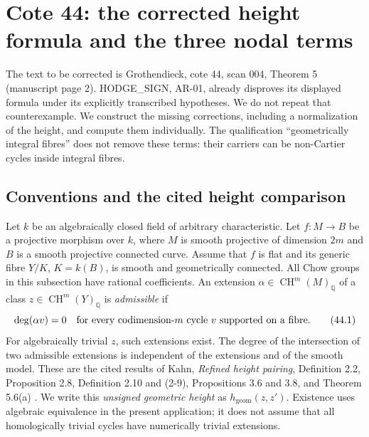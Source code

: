 
\section{Cote 44: the corrected height formula and the three nodal terms}
\label{sec:singular-fibres}

The text to be corrected is Grothendieck, cote 44, scan 004, Theorem 5
(manuscript page 2).  HODGE\_SIGN, AR-01, already disproves its displayed
formula under its explicitly transcribed hypotheses.  We do not repeat
that counterexample.  We construct the missing corrections, including a
normalization of the height, and compute them individually.  The
qualification ``geometrically integral fibres'' does not remove these
terms: their carriers can be non-Cartier cycles inside integral fibres.

\subsection{Conventions and the cited height comparison}

Let $k$ be an algebraically closed field of arbitrary characteristic.
Let $f:M\to B$ be a projective morphism over $k$,
where $M$ is smooth projective of dimension $2m$ and $B$ is a smooth
projective connected curve.  Assume that $f$ is flat and its generic
fibre $Y/K$, $K=k(B)$, is smooth and geometrically connected.  All Chow
groups in this subsection have rational coefficients.  An extension
$\alpha\in\operatorname{CH}^{m}(M)_{\mathbb Q}$ of a class
$z\in\operatorname{CH}^{m}(Y)_{\mathbb Q}$ is \emph{admissible} if
\[
 \deg(\alpha v)=0
 \quad\hbox{for every codimension-$m$ cycle $v$ supported on a fibre.}
 \tag{44.1}\label{eq:44-admissible}
\]
For algebraically trivial $z$, such extensions exist.  The degree of the
intersection of two admissible extensions is independent of the
extensions and of the smooth model.  These are the cited results of
Kahn, \emph{Refined height pairing}, Definition 2.2, Proposition 2.8,
Definition 2.10 and (2-9), Propositions 3.6 and 3.8, and Theorem 5.6(a)
\cite{KahnHeight2024}.  We write this \emph{unsigned geometric height} as
$h_{\mathrm{geom}}(z,z')$.  Existence uses algebraic equivalence in the
present application; it does not assume that all homologically trivial
cycles have numerically trivial extensions.

